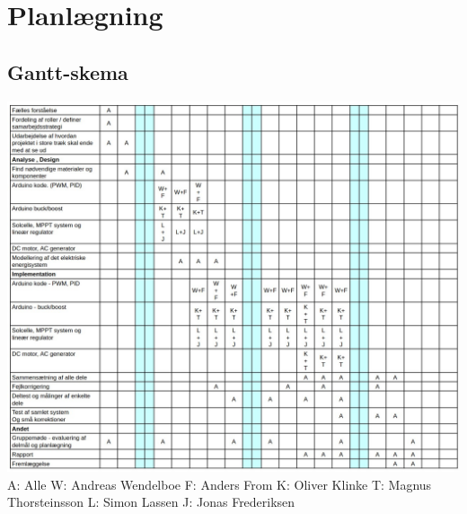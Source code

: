 \section{Planlægning}

\subsection{Gantt-skema}
\includegraphics[width=\textwidth]{Dokumentation/Figures/Gantt Chart.jpg}
\label{fig: Gantt-Skema}
A: Alle \newline
W: Andreas Wendelboe\newline
F: Anders From\newline
K: Oliver Klinke\newline
T: Magnus Thorsteinsson\newline
L: Simon Lassen\newline
J: Jonas Frederiksen\newline